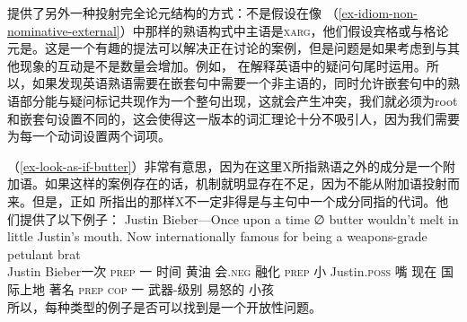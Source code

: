  \citet[\S~6]{KSF2015a}提供了另外一种投射完全论元结构的方式：不是假设在像 （\ref{ex-idiom-non-nominative-external}）中那样的熟语构式中主语是\textsc{xarg}，他们假设宾格或与格论元是\xargc。这是一个有趣的提法可以解决正在讨论的案例，但是问题是如果考虑到与其他现象的互动是不是数量会增加。例如， \citet{BF99a}在解释英语中的疑问句尾时运用\xargc。所以，如果发现英语熟语需要在嵌套句中需要一个非主语的\xargc，同时允许嵌套句中的熟语部分能与疑问标记共现作为一个整句出现，这就会产生冲突，我们就必须为root和嵌套句设置不同的\xargc，这会使得这一版本的词汇理论十分不吸引人，因为我们需要为每一个动词设置两个词项。

（\ref{ex-look-as-if-butter}）非常有意思，因为在这里X所指熟语之外的成分是一个附加语。如果这样的案例存在的话，\xargc 机制就明显存在不足，因为\xargc 不能从附加语投射而来。但是，正如 \citet{KSF2015a}所指出的那样X不一定非得是与主句中一个成分同指的代词。他们提供了以下例子：
\ea
\gll Justin Bieber—Once upon a time ∅ butter wouldn't melt in little Justin's mouth. Now internationally famous for being a weapons-grade petulant brat\\    %
     Justin Bieber一次 \textsc{prep} 一 时间 {} 黄油 会.\textsc{neg} 融化 \textsc{prep} 小 Justin.\textsc{poss} 嘴 现在 国际上地 著名 \textsc{prep} \textsc{cop} 一 武器-级别 易怒的 小孩\\
\z
所以，每种类型的例子是否可以找到是一个开放性问题。

